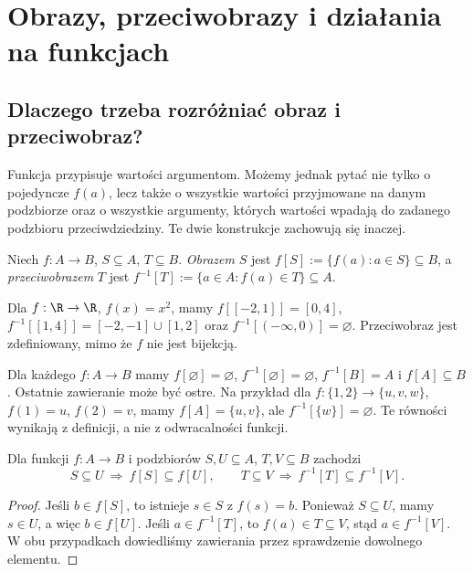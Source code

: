 \chapter{Obrazy, przeciwobrazy i działania na funkcjach}\label{ch:function-operations}
\section{Dlaczego trzeba rozróżniać obraz i przeciwobraz?}
Funkcja przypisuje wartości argumentom. Możemy jednak pytać nie tylko o pojedyncze $f(a)$, lecz także o wszystkie wartości przyjmowane na danym podzbiorze oraz o wszystkie argumenty, których wartości wpadają do zadanego podzbioru przeciwdziedziny. Te dwie konstrukcje zachowują się inaczej.
\begin{definicja}\label{def:image-preimage}
Niech $f:A\to B$, $S\subseteq A$, $T\subseteq B$. \emph{Obrazem} $S$ jest $f[S]:=\{f(a):a\in S\}\subseteq B$, a \emph{przeciwobrazem} $T$ jest $f^{-1}[T]:=\{a\in A:f(a)\in T\}\subseteq A$.
\end{definicja}
\begin{przyklad}
Dla $f:\R\to\R$, $f(x)=x^2$, mamy $f[[-2,1]]=[0,4]$, $f^{-1}[[1,4]]=[-2,-1]\cup[1,2]$ oraz $f^{-1}[(-\infty,0)]=\varnothing$. Przeciwobraz jest zdefiniowany, mimo że $f$ nie jest bijekcją.
\end{przyklad}

\begin{uwaga}
Dla każdego $f:A\to B$ mamy $f[\varnothing]=\varnothing$,
$f^{-1}[\varnothing]=\varnothing$, $f^{-1}[B]=A$ i
$f[A]\subseteq B$. Ostatnie zawieranie może być ostre.
Na przykład dla $f:\{1,2\}\to\{u,v,w\}$,
$f(1)=u$, $f(2)=v$, mamy $f[A]=\{u,v\}$, ale
$f^{-1}[\{w\}]=\varnothing$. Te równości wynikają z definicji,
a nie z odwracalności funkcji.
\end{uwaga}
\begin{twierdzenie}
\label{thm:images-monotone-xliv}
Dla funkcji $f:A\to B$ i podzbiorów $S,U\subseteq A$,
$T,V\subseteq B$ zachodzi
\[
 S\subseteq U\ \Longrightarrow\ f[S]\subseteq f[U],\qquad
 T\subseteq V\ \Longrightarrow\ f^{-1}[T]\subseteq f^{-1}[V].
\]
\end{twierdzenie}
\begin{proof}
Jeśli $b\in f[S]$, to istnieje $s\in S$ z $f(s)=b$.
Ponieważ $S\subseteq U$, mamy $s\in U$, a więc $b\in f[U]$.
Jeśli $a\in f^{-1}[T]$, to $f(a)\in T\subseteq V$,
stąd $a\in f^{-1}[V]$. W obu przypadkach dowiedliśmy
zawierania przez sprawdzenie dowolnego elementu.
\end{proof}

